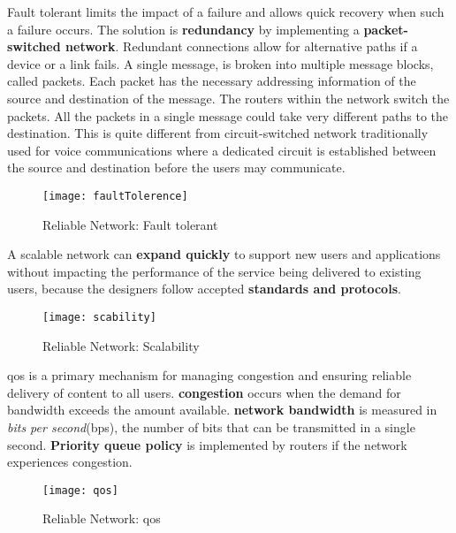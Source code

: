 \documentclass[crop=false]{standalone}
\begin{document}
\begin{flushleft}
Fault tolerant limits the impact of a failure and allows quick recovery when such a failure occurs. The solution is \textbf{\gls{redundancy}} by implementing a \textbf{\gls{packet-switched network}}. Redundant connections allow for alternative paths if a device or a link fails. A single message, is broken into multiple message blocks, called packets. Each packet has the necessary addressing information of the source and destination of the message. The routers within the network switch the packets. All the packets in a single message could take very different paths to the destination. This is quite different from circuit-switched network traditionally used for voice communications where a dedicated circuit is established between the source and destination before the users may communicate.
\end{flushleft}
\begin{figure}[ht]
  \centering
  \texttt{[image: faultTolerence]}
  \caption{Reliable Network: Fault tolerant}
  \label{fig:Reliable Network: Fault tolerant}
\end{figure}

\begin{flushleft}
A scalable network can \textbf{expand quickly} to support new users and applications without impacting the performance of the service being delivered to existing users, because the designers follow accepted \textbf{standards and protocols}.
\end{flushleft}
\begin{figure}[ht]
  \centering
  \texttt{[image: scability]}
  \caption{Reliable Network: Scalability}
  \label{fig:Reliable Network: Scalability}
\end{figure}

\begin{flushleft}
\acrshort{qos} is a primary mechanism for managing congestion and ensuring reliable delivery of content to all users. \textbf{\Gls{congestion}} occurs when the demand for bandwidth exceeds the amount available. \textbf{\Gls{network bandwidth}} is measured in \textit{bits per second}(bps), the number of bits that can be transmitted in a single second. \textbf{Priority queue policy} is implemented by routers if the network experiences congestion.
\end{flushleft}
\begin{figure}[ht]
  \centering
  \texttt{[image: qos]}
  \caption{Reliable Network: \acrfull{qos}}
  \label{fig:Reliable Network: QoS(Quality of Service)}
\end{figure}
\end{document}
